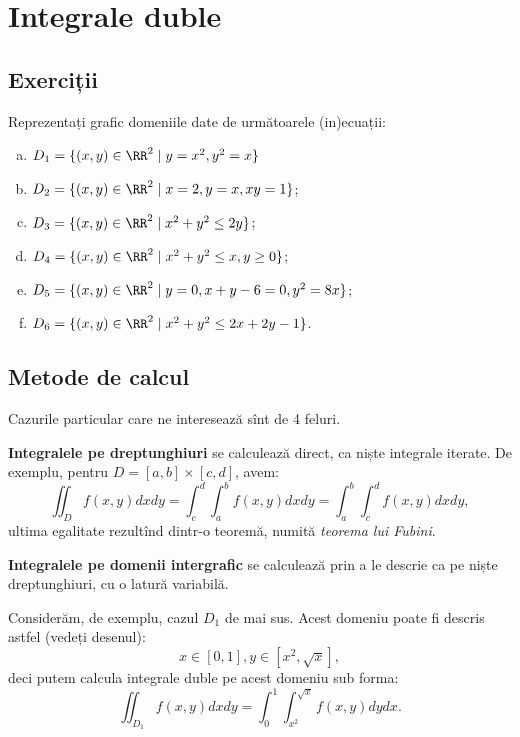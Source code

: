
\chapter{Integrale duble}

\section{Exerciții}

Reprezentați grafic domeniile date de următoarele (in)ecuații:
\begin{enumerate}[(a)]
    \item $ D_1 = \{ (x, y) \in \RR^2 \mid y = x^2, y^2 = x \} $
    \item $ D_2 = \{ (x, y) \in \RR^2 \mid x = 2, y = x, xy = 1 \} $;
    \item $ D_3 = \{ (x, y) \in \RR^2 \mid x^2 + y^2 \leq 2y \} $;
    \item $ D_4 = \{ (x, y) \in \RR^2 \mid x^2 + y^2 \leq x, y \geq 0 \} $;
    \item $ D_5 = \{ (x, y) \in \RR^2 \mid y = 0, x + y - 6 = 0, y^2 = 8x \} $;
    \item $ D_6 = \{ (x, y) \in \RR^2 \mid x^2 + y^2 \leq 2x + 2y - 1 \} $.
\end{enumerate}

\section{Metode de calcul}

Cazurile particular care ne interesează sînt de 4 feluri.

\textbf{Integralele pe dreptunghiuri} se calculează direct, ca niște
integrale iterate. De exemplu, pentru $ D = [a, b] \times [c, d] $,
avem:
\[
    \iint_D f(x, y) dxdy = \int_c^d \int_a^b f(x, y) dxdy = %
    \int_a^b \int_c^d f(x, y) dxdy,
\]
ultima egalitate rezultînd dintr-o teoremă, numită \textit{teorema lui %
Fubini}.

\textbf{Integralele pe domenii intergrafic} se calculează prin a le descrie
ca pe niște dreptunghiuri, cu o latură variabilă.

Considerăm, de exemplu, cazul $ D_1 $ de mai sus. Acest domeniu poate fi
descris astfel (vedeți desenul):
\[
    x \in [0, 1], y \in [x^2, \sqrt{x}],
\]
deci putem calcula integrale duble pe acest domeniu sub forma:
\[
    \iint_{D_1} f(x, y) dxdy = \int_0^1 \int_{x^2}^{\sqrt{x}} f(x, y) dy dx.
\]


